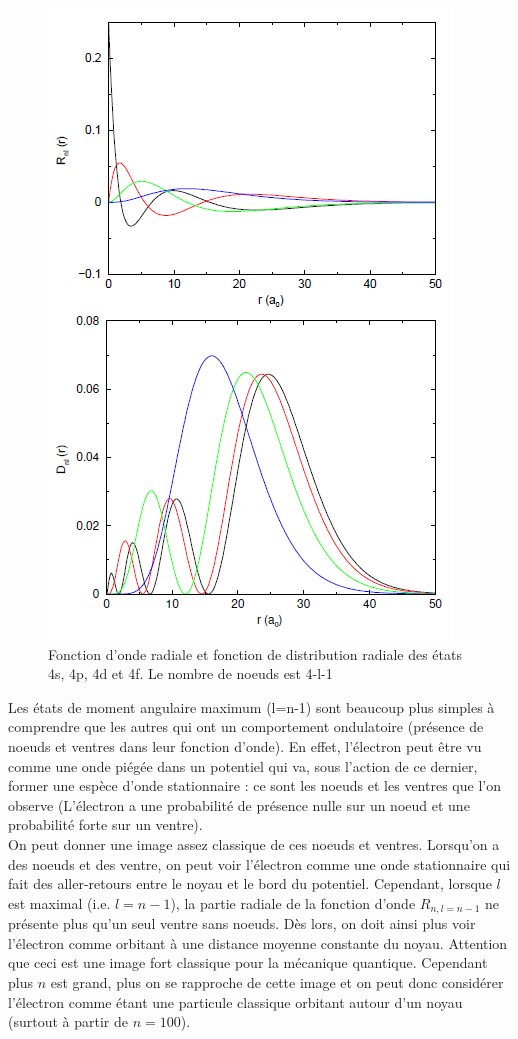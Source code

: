 \begin{figure}[tph]
    \centering
    \includegraphics{Images2/spdf.PNG}
    \caption{Fonction d'onde radiale et fonction de distribution radiale des états 4s, 4p, 4d et 4f. Le nombre de noeuds est 4-l-1}
    \label{fig:fcx_rad_3}
\end{figure}

Les états de moment angulaire maximum (l=n-1) sont beaucoup plus simples à comprendre que les autres qui ont un comportement ondulatoire (présence de noeuds et ventres dans leur fonction d'onde). En effet, l'électron peut être vu comme une onde piégée dans un potentiel qui va, sous l'action de ce dernier, former une espèce d'onde stationnaire : ce sont les noeuds et les ventres que l'on observe (L'électron a une probabilité de présence nulle sur un noeud et une probabilité forte sur un ventre).\\
On peut donner une image assez classique de ces noeuds et ventres. Lorsqu'on a des noeuds et des ventre, on peut voir l'électron comme une onde stationnaire qui fait des aller-retours entre le noyau et le bord du potentiel. Cependant, lorsque $l$ est maximal (i.e. $l=n-1$), la partie radiale de la fonction d'onde $R_{n,l=n-1}$ ne présente plus qu'un seul ventre sans noeuds. Dès lors, on doit ainsi plus voir l'électron comme orbitant à une distance moyenne constante du noyau. Attention que ceci est une image fort classique pour la mécanique quantique. Cependant plus $n$ est grand, plus on se rapproche de cette image et on peut donc considérer l'électron comme étant une particule classique orbitant autour d'un noyau (surtout à partir de $n=100$).




